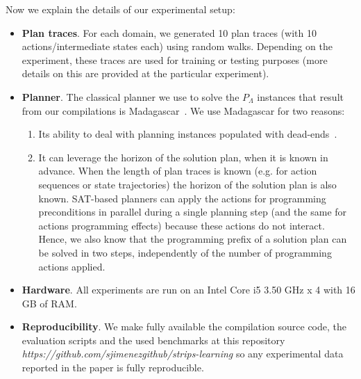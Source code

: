 Now we explain the details of our experimental setup:
\begin{itemize}
\item {\bf Plan traces}. For each domain, we generated 10 plan traces (with 10 actions/intermediate states each) using random walks. Depending on the experiment, these traces are used for training or testing purposes (more details on this are provided at the particular experiment).

\item {\bf Planner}. The classical planner we use to solve the $P_\Lambda$ instances that result from our compilations is {\sc Madagascar}~\cite{rintanen2014madagascar}. We use {\sc Madagascar} for two reasons:
  \begin{enumerate}
  \item  Its ability to deal with planning instances populated with dead-ends~\cite{lopez2015deterministic}.
  \item  It can leverage the horizon of the solution plan, when it is known in advance. When the length of plan traces is known (e.g. for \FO action sequences or \FO state trajectories) the horizon of the solution plan is also known. SAT-based planners can apply the actions for programming preconditions in parallel during a single planning step (and the same for actions programming effects) because these actions do not interact. Hence, we also know that the programming prefix of a solution plan can be solved in two steps, independently of the number of programming actions applied.
  \end{enumerate}

\item {\bf Hardware}. All experiments are run on an Intel Core i5 3.50 GHz x 4 with 16 GB of RAM.

\item {\bf Reproducibility}. We make fully available the compilation source code, the evaluation scripts and the used benchmarks at this repository {\em https://github.com/sjimenezgithub/strips-learning} so any experimental data reported in the paper is fully reproducible.
\end{itemize}

